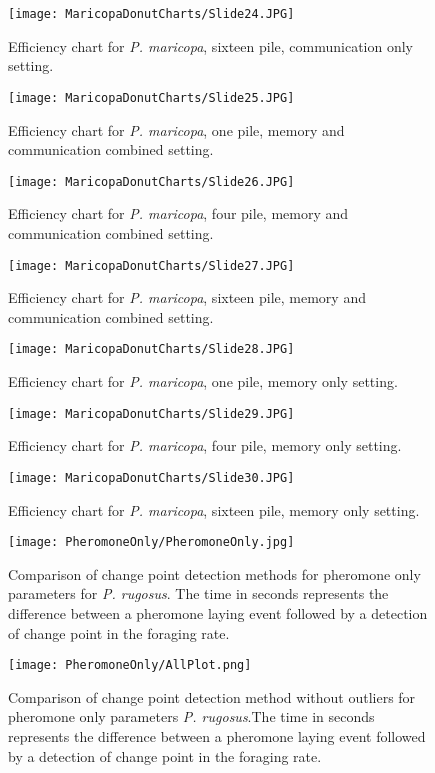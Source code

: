 \begin{figure}[h]
	\texttt{[image: MaricopaDonutCharts/Slide24.JPG]}
	\caption{Efficiency chart for \textit{P. maricopa}, sixteen pile,  communication only setting.}
\end{figure}
\begin{figure}[h]
	\texttt{[image: MaricopaDonutCharts/Slide25.JPG]}
	\caption{Efficiency chart for \textit{P. maricopa}, one pile,  memory and communication combined setting.}
\end{figure}
\begin{figure}[h]
	\texttt{[image: MaricopaDonutCharts/Slide26.JPG]}
	\caption{Efficiency chart for \textit{P. maricopa}, four pile, memory and communication combined setting.}
\end{figure}
\begin{figure}[h]
	\texttt{[image: MaricopaDonutCharts/Slide27.JPG]}
	\caption{Efficiency chart for \textit{P. maricopa}, sixteen pile,  memory and communication combined setting.}
\end{figure}
\begin{figure}[h]
	\texttt{[image: MaricopaDonutCharts/Slide28.JPG]}
	\caption{Efficiency chart for \textit{P. maricopa}, one pile,  memory only setting.}
\end{figure}
\begin{figure}[h]
	\texttt{[image: MaricopaDonutCharts/Slide29.JPG]}
	\caption{Efficiency chart for \textit{P. maricopa}, four pile,  memory only setting.}
\end{figure}
\begin{figure}[h]
	\texttt{[image: MaricopaDonutCharts/Slide30.JPG]}
	\caption{Efficiency chart for \textit{P. maricopa}, sixteen pile,  memory only setting.}
\end{figure}
\clearpage
\begin{figure}
	\texttt{[image: PheromoneOnly/PheromoneOnly.jpg]}
	\caption{Comparison of change point detection methods for pheromone only parameters for \textit{P. rugosus}. The time in seconds represents the difference between a pheromone laying event followed by a detection of change point in the foraging rate.}
\end{figure}
\begin{figure}
	\texttt{[image: PheromoneOnly/AllPlot.png]}
	\caption{Comparison of change point detection method without outliers for pheromone only parameters \textit{P. rugosus}.The time in seconds represents the difference between a pheromone laying event followed by a detection of change point in the foraging rate.}
\end{figure}
